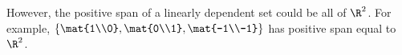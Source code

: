 \begin{enumerate}
\begin{enumerate}
					However, the positive span of a linearly dependent set could be all of $\R^2$. For example, $\left\{
						\mat{1\\0},\mat{0\\1},\mat{-1\\-1}\right\}$ has positive span equal to $\R^2$.
			\end{enumerate}
		\end{enumerate}